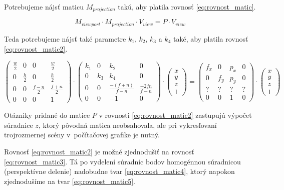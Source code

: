 Potrebujeme nájsť maticu $M_{projection}$ takú, aby platila rovnosť \ref{eq:rovnost_matic}.

\begin{equation}
M_{viewport} \cdot M_{projection} \cdot V_{view} = P \cdot V_{view}
\label{eq:rovnost_matic}
\end{equation}

Teda potrebujeme nájsť také parametre $k_1$, $k_2$, $k_3$ a $k_4$ také, aby platila rovnosť \ref{eq:rovnost_matic2}.

\begin{equation}
\begin{pmatrix}
\frac{w}{2} & 0 & 0 & \frac{w}{2} \\
0 & \frac{h}{2} & 0 & \frac{h}{2} \\
0 & 0 & \frac{f-n}{2} & \frac{f+n}{2} \\
0 & 0 & 0 & 1
\end{pmatrix}
\cdot
\begin{pmatrix}
k_1 & 0 & k_2 & 0 \\
0 & k_3 & k_4 & 0 \\
0 & 0 & \frac{-(f+n)}{f-n} & \frac{-2fn}{f-n} \\
0 & 0 & -1 & 0
\end{pmatrix}
\cdot
\begin{pmatrix}
x \\
y \\
z \\
1
\end{pmatrix}
=
\begin{pmatrix}
f_x & 0 & p_x & 0 \\
0 & f_y & p_y & 0 \\
? & ? & ? & ? \\
0 & 0 &  1  & 0
\end{pmatrix}
\cdot
\begin{pmatrix}
x \\
y \\
z \\
1
\end{pmatrix}
\label{eq:rovnost_matic2}
\end{equation}

Otázniky pridané do matice $P$ v rovnosti \ref{eq:rovnost_matic2} zastupujú výpočet súradnice $z$, ktorý pôvodná matica neobsahovala, ale pri vykresľovaní trojrozmernej scény v~počítačovej grafike je nutný.

Rovnosť \ref{eq:rovnost_matic2} je možné zjednodušiť na rovnosť \ref{eq:rovnost_matic3}. Tá po vydelení súradníc bodov homogénnou súradnicou (perspektívne delenie) nadobudne tvar \ref{eq:rovnost_matic4}, ktorý napokon zjednodušíme na tvar \ref{eq:rovnost_matic5}.

